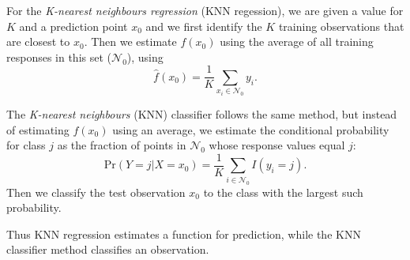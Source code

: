 For the \textit{K-nearest neighbours regression} (KNN regession), we
are given a value
for $K$ and a prediction point $x_0$ and we first identify the $K$
training observations
that are closest to $x_0$. Then we estimate $f(x_0)$ using the
average of all training
responses in this set ($\mathcal{N}_0$), using
\[
    \hat{f}(x_0) = \frac{1}{K}\sum_{x_i \in \mathcal{N}_0}{y_i}.
\]

The \textit{K-nearest neighbours} (KNN) classifier follows the same
method, but instead
of estimating $f(x_0)$ using an average, we estimate the conditional
probability for
class $j$ as the fraction of points in $\mathcal{N}_0$ whose response
values equal $j$:
\[
    \text{Pr}(Y = j \vert X = x_0) = \frac{1}{K} \sum_{i \in
    \mathcal{N}_0} I(y_i = j).
\]
Then we classify the test observation $x_0$ to the class with the largest such
probability.

Thus KNN regression estimates a function for prediction, while the
KNN classifier method
classifies an observation.
